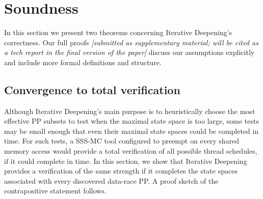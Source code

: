 \section{Soundness}
\label{sec:soundness}

In this section we present two theorems concerning Iterative Deepening's correctness.
Our full proofs
{\em [submitted as supplementary material; will be cited as a tech report in the final version of the paper]}
discuss our assumptions explicitly and include more formal definitions and structure.

\renewcommand\proofname{Proof Sketch}


\subsection{Convergence to total verification}
\label{sec:totalverif}

Although Iterative Deepening's main purpose is to heuristically choose the most effective PP subsets to test
when the maximal state space is too large,
some tests may be small enough that even their maximal state spaces could be completed in time.
For such tests, a SSS-MC tool configured to preempt on every shared memory access \cite{spin,inspect} would provide a total verification of all possible thread schedules, if it could complete in time.
In this section, we show that Iterative Deepening provides a verification of the same strength if it completes the state spaces associated with every discovered data-race PP.
A proof sketch of the contrapositive statement follows.

